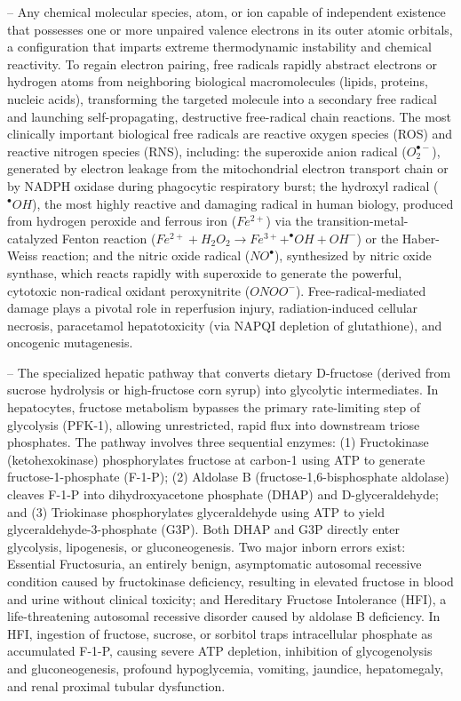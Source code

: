 -- Any chemical molecular species, atom, or ion capable of independent existence that possesses one or more unpaired valence electrons in its outer atomic orbitals, a configuration that imparts extreme thermodynamic instability and chemical reactivity. To regain electron pairing, free radicals rapidly abstract electrons or hydrogen atoms from neighboring biological macromolecules (lipids, proteins, nucleic acids), transforming the targeted molecule into a secondary free radical and launching self-propagating, destructive free-radical chain reactions. The most clinically important biological free radicals are reactive oxygen species (ROS) and reactive nitrogen species (RNS), including: the superoxide anion radical ($O_2^{\bullet-}$), generated by electron leakage from the mitochondrial electron transport chain or by NADPH oxidase during phagocytic respiratory burst; the hydroxyl radical ($^{\bullet}OH$), the most highly reactive and damaging radical in human biology, produced from hydrogen peroxide and ferrous iron ($Fe^{2+}$) via the transition-metal-catalyzed Fenton reaction ($Fe^{2+} + H_2O_2 \to Fe^{3+} + ^{\bullet}OH + OH^-$) or the Haber-Weiss reaction; and the nitric oxide radical ($NO^\bullet$), synthesized by nitric oxide synthase, which reacts rapidly with superoxide to generate the powerful, cytotoxic non-radical oxidant peroxynitrite ($ONOO^-$). Free-radical-mediated damage plays a pivotal role in reperfusion injury, radiation-induced cellular necrosis, paracetamol hepatotoxicity (via NAPQI depletion of glutathione), and oncogenic mutagenesis.

-- The specialized hepatic pathway that converts dietary D-fructose (derived from sucrose hydrolysis or high-fructose corn syrup) into glycolytic intermediates. In hepatocytes, fructose metabolism bypasses the primary rate-limiting step of glycolysis (PFK-1), allowing unrestricted, rapid flux into downstream triose phosphates. The pathway involves three sequential enzymes: (1) Fructokinase (ketohexokinase) phosphorylates fructose at carbon-1 using ATP to generate fructose-1-phosphate (F-1-P); (2) Aldolase B (fructose-1,6-bisphosphate aldolase) cleaves F-1-P into dihydroxyacetone phosphate (DHAP) and D-glyceraldehyde; and (3) Triokinase phosphorylates glyceraldehyde using ATP to yield glyceraldehyde-3-phosphate (G3P). Both DHAP and G3P directly enter glycolysis, lipogenesis, or gluconeogenesis. Two major inborn errors exist: Essential Fructosuria, an entirely benign, asymptomatic autosomal recessive condition caused by fructokinase deficiency, resulting in elevated fructose in blood and urine without clinical toxicity; and Hereditary Fructose Intolerance (HFI), a life-threatening autosomal recessive disorder caused by aldolase B deficiency. In HFI, ingestion of fructose, sucrose, or sorbitol traps intracellular phosphate as accumulated F-1-P, causing severe ATP depletion, inhibition of glycogenolysis and gluconeogenesis, profound hypoglycemia, vomiting, jaundice, hepatomegaly, and renal proximal tubular dysfunction.

